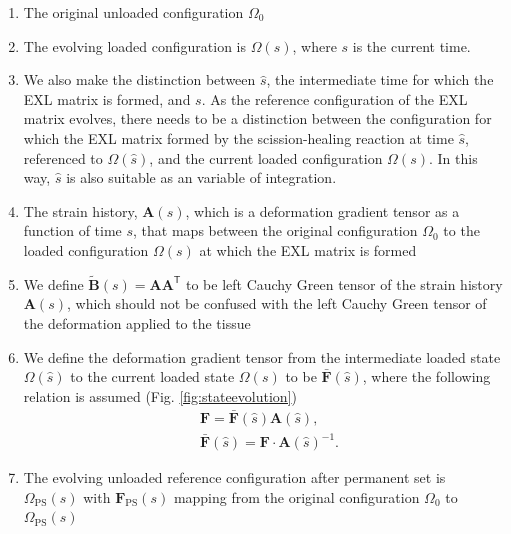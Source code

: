\begin{enumerate}

\item The original unloaded configuration $\Omega_0$ 

\item The evolving loaded configuration is $\Omega(s)$, where $s$ is the current time. 

\item We also make the distinction between $\hat{s}$, the intermediate time for which the EXL matrix is formed, and $s$. As the reference configuration of the EXL matrix evolves, there needs to be a distinction between the configuration for which the EXL matrix formed by the scission-healing reaction at time $\hat{s}$, referenced to $\Omega(\hat{s})$, and the current loaded configuration $\Omega(s)$. In this way, $\hat{s}$ is also suitable as an variable of integration.

\item The strain history, $\mathbf{A}(s)$, which is a deformation gradient tensor as a function of time $s$, that maps between the original configuration $\Omega_0$ to the loaded configuration $\Omega(s)$ at which the EXL matrix is formed

\item We define $\tilde{\mathbf{B}}(s) = \mathbf{A}\mathbf{A}^\mathsf{T}$ to be left Cauchy Green tensor of the strain history $\mathbf{A}(s)$, which should not be confused with the left Cauchy Green tensor of the deformation applied to the tissue

\item We define the deformation gradient tensor from the intermediate loaded state $\Omega(\hat{s})$ to the current loaded state $\Omega(s)$ to be $\mathbf{\bar{F}}(\hat{s})$, where the following relation is assumed (Fig. \ref{fig:stateevolution})
\begin{equation} \label{eq:strainhistory}
\begin{split}
&\mathbf{F} = \mathbf{\bar{F}}(\hat{s})\mathbf{A}(\hat{s}), \\
&\mathbf{\bar{F}}(\hat{s}) = \mathbf{F} \cdot \mathbf{A}(\hat{s})^{-1}.
\end{split}
\end{equation}

\item The evolving unloaded reference configuration after permanent set is $\Omega_\mathrm{PS}(s)$ with $\mathbf{F}_\mathrm{PS}(s)$ mapping from the original configuration $\Omega_0$ to $\Omega_\mathrm{PS}(s)$

\end{enumerate}

